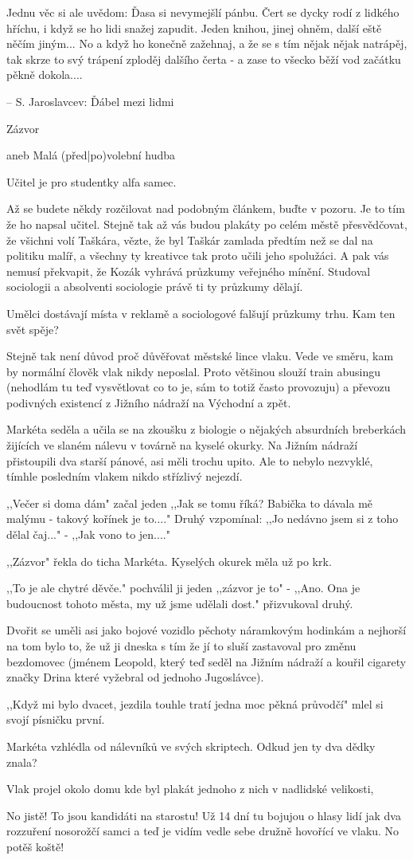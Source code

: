 Jednu věc si ale uvědom: Ďasa si nevymejšlí pánbu. Čert se dycky rodí z lidkého hříchu, i když se ho lidi snažej zapudit. Jeden knihou, jinej ohněm, další eště něčím jiným... No a když ho konečně zažehnaj, a že se s tím nějak nějak natrápěj, tak skrze to svý trápení zploděj dalšího čerta - a zase to všecko běží vod začátku pěkně dokola....

-- S. Jaroslavcev: Ďábel mezi lidmi


Zázvor

aneb Malá (před|po)volební hudba

Učitel je pro studentky alfa samec.

Až se budete někdy rozčilovat nad podobným článkem, buďte v pozoru. Je to tím že ho napsal učitel. Stejně tak až vás budou plakáty po celém městě přesvědčovat, že  všichni volí Taškára, vězte, že byl Taškár zamlada předtím než se dal na politiku malíř, a všechny ty kreativce tak proto učili jeho spolužáci. A pak vás nemusí překvapit, že Kozák vyhrává průzkumy veřejného mínění. Studoval sociologii a absolventi sociologie právě ti ty průzkumy dělají.

Umělci dostávají místa v reklamě a sociologové falšují průzkumy trhu. Kam ten svět spěje?

Stejně tak není důvod proč důvěřovat městské lince vlaku. Vede ve směru, kam by normální člověk vlak nikdy neposlal. Proto většinou slouží train abusingu (nehodlám tu teď vysvětlovat co to je, sám to totiž často provozuju) a převozu podivných existencí z Jižního nádraží na Východní a zpět.

Markéta seděla a učila se na zkoušku z biologie o nějakých absurdních breberkách žijících ve slaném nálevu v továrně na kyselé okurky. Na Jižním nádraží přistoupili dva starší pánové, asi měli trochu upito. Ale to nebylo nezvyklé, tímhle posledním vlakem nikdo střízlivý nejezdí.

,,Večer si doma dám" začal jeden ,,Jak se tomu říká? Babička to dávala mě malýmu - takový kořínek je to...." Druhý vzpomínal: ,,Jo nedávno jsem si z toho dělal čaj..." - ,,Jak vono to jen...."

,,Zázvor" řekla do ticha Markéta. Kyselých okurek měla už po krk.

,,To je ale chytré děvče." pochválil ji jeden ,,zázvor je to" - ,,Ano. Ona je budoucnost tohoto města, my už jsme udělali dost." přizvukoval druhý.

Dvořit se uměli asi jako bojové vozidlo pěchoty náramkovým hodinkám a nejhorší na tom bylo to, že už ji dneska s tím že jí to sluší zastavoval pro změnu bezdomovec (jménem Leopold, který teď seděl na Jižním nádraží a kouřil cigarety značky Drina které vyžebral od jednoho Jugoslávce).

,,Když mi bylo dvacet, jezdila touhle tratí jedna moc pěkná průvodčí" mlel si svojí písničku první.

Markéta vzhlédla od nálevníků ve svých skriptech. Odkud jen ty dva dědky znala?

Vlak projel okolo domu kde byl plakát jednoho z nich v nadlidské velikosti,

No jistě! To jsou kandidáti na starostu! Už 14 dní tu bojujou o hlasy lidí jak dva rozzuření nosorožčí samci a teď je vidím vedle sebe družně hovořící ve vlaku. No potěš koště!